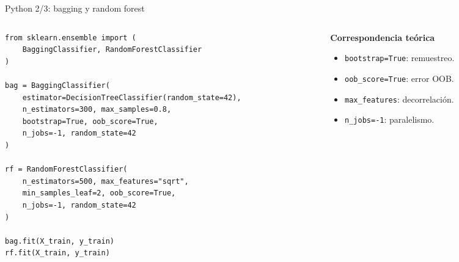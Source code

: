 \documentclass[aspectratio=169,11pt,table]{beamer}
\begin{document}
\begin{frame}[fragile]{Python 2/3: bagging y random forest}
\begin{columns}[T,onlytextwidth]
\begin{column}{0.62\textwidth}
\begin{lstlisting}[style=ccdepython]
from sklearn.ensemble import (
    BaggingClassifier, RandomForestClassifier
)

bag = BaggingClassifier(
    estimator=DecisionTreeClassifier(random_state=42),
    n_estimators=300, max_samples=0.8,
    bootstrap=True, oob_score=True,
    n_jobs=-1, random_state=42
)

rf = RandomForestClassifier(
    n_estimators=500, max_features="sqrt",
    min_samples_leaf=2, oob_score=True,
    n_jobs=-1, random_state=42
)

bag.fit(X_train, y_train)
rf.fit(X_train, y_train)
\end{lstlisting}
\end{column}
\begin{column}{0.34\textwidth}
\begin{keybox}
\textbf{Correspondencia teórica}
\begin{itemize}
  \item \texttt{bootstrap=True}: remuestreo.
  \item \texttt{oob\_score=True}: error OOB.
  \item \texttt{max\_features}: decorrelación.
  \item \texttt{n\_jobs=-1}: paralelismo.
\end{itemize}
\end{keybox}
\end{column}
\end{columns}
\end{frame}
\end{document}
